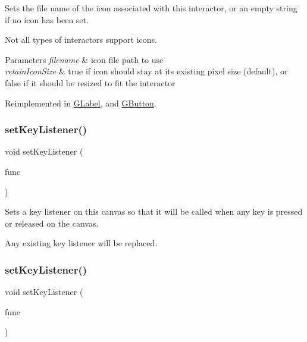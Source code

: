 Sets the file name of the icon associated with this interactor, or an empty string if no icon has been set. 

Not all types of interactors support icons. 
\begin{DoxyParams}{Parameters}
{\em filename} & icon file path to use \\
\hline
{\em retain\+Icon\+Size} & true if icon should stay at its existing pixel size (default), or false if it should be resized to fit the interactor \\
\hline
\end{DoxyParams}


Reimplemented in \mbox{\hyperlink{classGLabel_a75753a3d7d3364185f8088d63b664cb1}{G\+Label}}, and \mbox{\hyperlink{classGButton_a75753a3d7d3364185f8088d63b664cb1}{G\+Button}}.

\mbox{\label{classGCanvas_aeb8324d3287fa1fbe093f4d6230cf0a6}} 
\subsubsection{\texorpdfstring{set\+Key\+Listener()}{setKeyListener()}\hspace{0.1cm}{\footnotesize\ttfamily [1/2]}}
{\footnotesize\ttfamily void set\+Key\+Listener (\begin{DoxyParamCaption}\item[{G\+Event\+Listener}]{func }\end{DoxyParamCaption})\hspace{0.3cm}{\ttfamily [virtual]}}



Sets a key listener on this canvas so that it will be called when any key is pressed or released on the canvas. 

Any existing key listener will be replaced. \mbox{\label{classGCanvas_ae48ecea73606c7bd9423e1c7cc589cc9}} 
\subsubsection{\texorpdfstring{set\+Key\+Listener()}{setKeyListener()}\hspace{0.1cm}{\footnotesize\ttfamily [2/2]}}
{\footnotesize\ttfamily void set\+Key\+Listener (\begin{DoxyParamCaption}\item[{G\+Event\+Listener\+Void}]{func }\end{DoxyParamCaption})\hspace{0.3cm}{\ttfamily [virtual]}}



